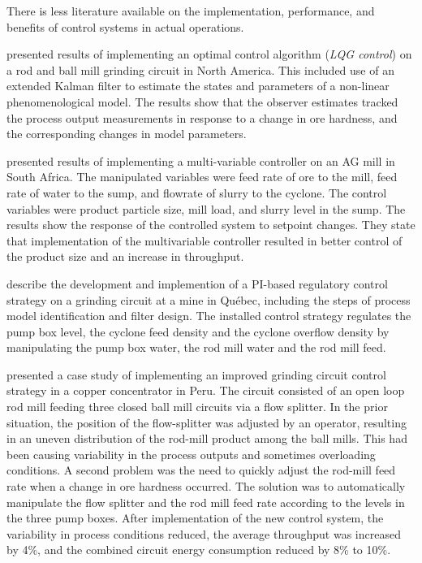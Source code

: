 There is less literature available on the implementation, performance, and benefits of control systems in actual operations.

\cite{herbst_optimal_1988} presented results of implementing an optimal control algorithm (\textit{LQG control}) on a rod and ball mill grinding circuit in North America. This included use of an extended Kalman filter to estimate the states and parameters of a non-linear phenomenological model. The results show that the observer estimates tracked the process output measurements in response to a change in ore hardness, and the corresponding changes in model parameters.

\cite{hulbert_multivariable_1990} presented results of implementing a multi-variable controller on an AG mill in South Africa. The manipulated variables were feed rate of ore to the mill, feed rate of water to the sump, and flowrate of slurry to the cyclone. The control variables were product particle size, mill load, and slurry level in the sump. The results show the response of the controlled system to setpoint changes. They state that implementation of the multivariable controller resulted in better control of the product size and an increase in throughput.

\cite{desbiens_distributed_1997} describe the development and implemention of a PI-based regulatory control strategy on a grinding circuit at a mine in Qu\'ebec, including the steps of process model identification and filter design. The installed control strategy regulates the pump box level, the cyclone feed density and the cyclone overflow density by manipulating the pump box water, the rod mill water and the rod mill feed. 

\cite{desbiens_using_2008} presented a case study of implementing an improved grinding circuit control strategy in a copper concentrator in Peru. The circuit consisted of an open loop rod mill feeding three closed ball mill circuits via a flow splitter. In the prior situation, the position of the flow-splitter was adjusted by an operator, resulting in an uneven distribution of the rod-mill product among the ball mills. This had been causing variability in the process outputs and sometimes overloading conditions. A second problem was the need to quickly adjust the rod-mill feed rate when a change in ore hardness occurred. The solution was to automatically manipulate the flow splitter and the rod mill feed rate according to the levels in the three pump boxes. After implementation of the new control system, the variability in process conditions reduced, the average throughput was increased by 4\%, and the combined circuit energy consumption reduced by 8\% to 10\%.

